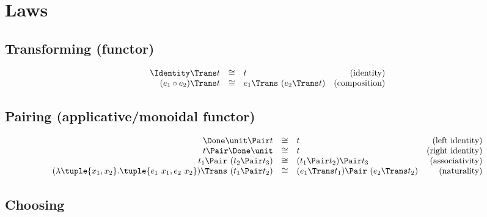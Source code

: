 
\section{Laws}

\subsection{Transforming (functor)}

\begin{equation*}
  \begin{array}{rclr}
    \Identity \Trans t
      &\cong& t
      & \text{(identity)} \\
    (e_1 \circ e_2) \Trans t
      &\cong& e_1 \Trans\ (e_2 \Trans t)
      & \text{(composition)} \\
  \end{array}
\end{equation*}


\subsection{Pairing (applicative/monoidal functor)}

\begin{equation*}
  \begin{array}{rclr}
    \Done \unit \Pair t
      &\cong& t
      & \text{(left identity)} \\
    t \Pair \Done \unit
      &\cong& t
      & \text{(right identity)} \\
    t_1 \Pair\ (t_2 \Pair t_3)
      &\cong& (t_1 \Pair t_2) \Pair t_3
      & \text{(associativity)} \\
    (\lambda \tuple{x_1, x_2}. \tuple{e_1\ x_1, e_2\ x_2}) \Trans\ (t_1 \Pair t_2)
      &\cong& (e_1 \Trans t_1) \Pair\ (e_2 \Trans t_2)
      & \text{(naturality)} \\
  \end{array}
\end{equation*}


\subsection{Choosing}

